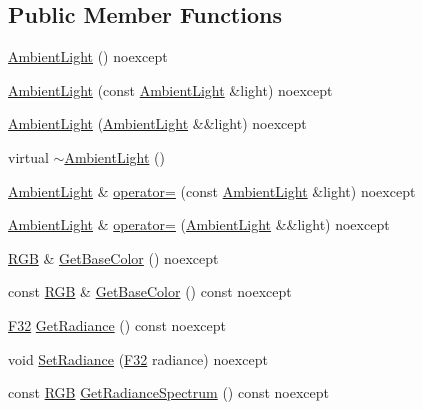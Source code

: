 \subsection*{Public Member Functions}
\begin{DoxyCompactItemize}
\item 
\hyperlink{classmage_1_1rendering_1_1_ambient_light_a178327bf02552f65b98ad3858416a81d}{Ambient\+Light} () noexcept
\item 
\hyperlink{classmage_1_1rendering_1_1_ambient_light_a363ca4f79eef6f0a95a2e3d381479af1}{Ambient\+Light} (const \hyperlink{classmage_1_1rendering_1_1_ambient_light}{Ambient\+Light} \&light) noexcept
\item 
\hyperlink{classmage_1_1rendering_1_1_ambient_light_a8bd09baed470ce2c09af6a9893549937}{Ambient\+Light} (\hyperlink{classmage_1_1rendering_1_1_ambient_light}{Ambient\+Light} \&\&light) noexcept
\item 
virtual \hyperlink{classmage_1_1rendering_1_1_ambient_light_a811cb86e80188b924085674a88a0bf7b}{$\sim$\+Ambient\+Light} ()
\item 
\hyperlink{classmage_1_1rendering_1_1_ambient_light}{Ambient\+Light} \& \hyperlink{classmage_1_1rendering_1_1_ambient_light_a351cdcd2e1b25c6a44356060f0e61c2b}{operator=} (const \hyperlink{classmage_1_1rendering_1_1_ambient_light}{Ambient\+Light} \&light) noexcept
\item 
\hyperlink{classmage_1_1rendering_1_1_ambient_light}{Ambient\+Light} \& \hyperlink{classmage_1_1rendering_1_1_ambient_light_aa571cc046cb35ceafba6cb0a2ec4bd6c}{operator=} (\hyperlink{classmage_1_1rendering_1_1_ambient_light}{Ambient\+Light} \&\&light) noexcept
\item 
\hyperlink{structmage_1_1_r_g_b}{R\+GB} \& \hyperlink{classmage_1_1rendering_1_1_ambient_light_ad4e1f6726b09f690d2abcdfd536d3908}{Get\+Base\+Color} () noexcept
\item 
const \hyperlink{structmage_1_1_r_g_b}{R\+GB} \& \hyperlink{classmage_1_1rendering_1_1_ambient_light_a68266fb710e72997d9bb0a02d7f5d416}{Get\+Base\+Color} () const noexcept
\item 
\hyperlink{namespacemage_aa97e833b45f06d60a0a9c4fc22ae02c0}{F32} \hyperlink{classmage_1_1rendering_1_1_ambient_light_ad78278e798956e1c3a707a37dfb052da}{Get\+Radiance} () const noexcept
\item 
void \hyperlink{classmage_1_1rendering_1_1_ambient_light_a2da2e614906dc166121a0d0d391b9fc2}{Set\+Radiance} (\hyperlink{namespacemage_aa97e833b45f06d60a0a9c4fc22ae02c0}{F32} radiance) noexcept
\item 
const \hyperlink{structmage_1_1_r_g_b}{R\+GB} \hyperlink{classmage_1_1rendering_1_1_ambient_light_a480e6b39d92266254778c23e8456e55e}{Get\+Radiance\+Spectrum} () const noexcept
\end{DoxyCompactItemize}
